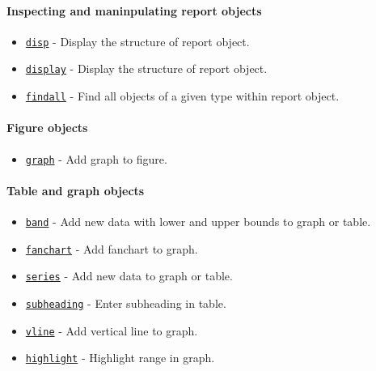 \paragraph{Inspecting and maninpulating report
objects}\label{inspecting-and-maninpulating-report-objects}

\begin{itemize}
\itemsep1pt\parskip0pt
\item
  \href{report/disp}{\texttt{disp}} - Display the structure of report
  object.
\item
  \href{report/display}{\texttt{display}} - Display the structure of
  report object.
\item
  \href{report/findall}{\texttt{findall}} - Find all objects of a given
  type within report object.
\end{itemize}

\paragraph{Figure objects}\label{figure-objects}

\begin{itemize}
\itemsep1pt\parskip0pt
\item
  \href{report/graph}{\texttt{graph}} - Add graph to figure.
\end{itemize}

\paragraph{Table and graph objects}\label{table-and-graph-objects}

\begin{itemize}
\itemsep1pt\parskip0pt
\item
  \href{report/band}{\texttt{band}} - Add new data with lower and upper
  bounds to graph or table.
\item
  \href{report/fanchart}{\texttt{fanchart}} - Add fanchart to graph.
\item
  \href{report/series}{\texttt{series}} - Add new data to graph or
  table.
\item
  \href{report/subheading}{\texttt{subheading}} - Enter subheading in
  table.
\item
  \href{report/vline}{\texttt{vline}} - Add vertical line to graph.
\item
  \href{report/highlight}{\texttt{highlight}} - Highlight range in
  graph.
\end{itemize}

